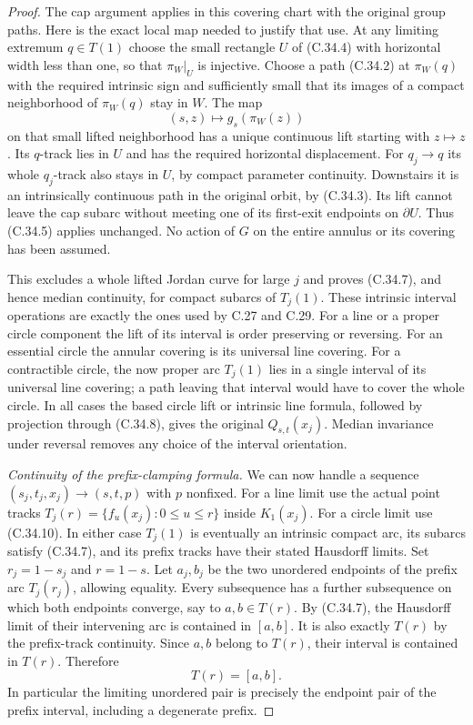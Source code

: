 \begin{proof}
The cap argument applies in this covering chart
with the original group paths. Here is the exact
local map needed to justify that use. At any
limiting extremum $q\in T(1)$ choose the small
rectangle $U$ of (C.34.4) with horizontal width
less than one, so that $\pi_W|_U$ is injective.
Choose a path (C.34.2) at $\pi_W(q)$ with the
required intrinsic sign and sufficiently small
that its images of a compact neighborhood of
$\pi_W(q)$ stay in $W$.
The map
\[
 (s,z)\longmapsto g_s(\pi_W(z))
                                                        \tag{C.34.11}
\]
on that small lifted neighborhood has a unique
continuous lift starting with $z\mapsto z$.
Its $q$-track lies in $U$ and has the required
horizontal displacement. For $q_j\to q$ its
whole $q_j$-track also stays in $U$, by compact
parameter continuity. Downstairs it is an
intrinsically continuous path in the original
orbit, by (C.34.3). Its lift cannot leave the
cap subarc without meeting one of its first-exit
endpoints on $\partial U$. Thus (C.34.5) applies
unchanged. No action of $G$ on the entire
annulus or its covering has been assumed.

This excludes a whole lifted Jordan curve for
large $j$ and proves (C.34.7), and hence median
continuity, for compact subarcs of $T_j(1)$.
These intrinsic interval operations are exactly
the ones used by C.27 and C.29. For a line or
a proper circle component the lift of its
interval is order preserving or reversing.
For an essential circle the annular covering
is its universal line covering. For a
contractible circle, the now proper arc
$T_j(1)$ lies in a single interval of its
universal line covering; a path leaving that
interval would have to cover the whole circle.
In all cases the based circle lift or intrinsic
line formula, followed by projection through
(C.34.8), gives the original $Q_{s,t}(x_j)$.
Median invariance under reversal removes any
choice of the interval orientation.

\emph{Continuity of the prefix-clamping formula.}
We can now handle a sequence
$(s_j,t_j,x_j)\to(s,t,p)$ with $p$ nonfixed.
For a line limit use the actual point tracks
$T_j(r)=\{f_u(x_j):0\leq u\leq r\}$ inside
$K_1(x_j)$. For a circle limit use (C.34.10).
In either case $T_j(1)$ is eventually an
intrinsic compact arc, its subarcs satisfy
(C.34.7), and its prefix tracks have their
stated Hausdorff limits.
Set $r_j=1-s_j$ and $r=1-s$.
Let $a_j,b_j$ be the two unordered endpoints
of the prefix arc $T_j(r_j)$, allowing equality.
Every subsequence has a further subsequence
on which both endpoints converge, say to
$a,b\in T(r)$. By (C.34.7), the Hausdorff
limit of their intervening arc is contained
in $[a,b]$. It is also exactly $T(r)$ by
the prefix-track continuity. Since $a,b$
belong to $T(r)$, their interval is contained
in $T(r)$. Therefore
\[
                         T(r)=[a,b].                    \tag{C.34.12}
\]
In particular the limiting unordered pair is
precisely the endpoint pair of the prefix
interval, including a degenerate prefix.


\end{proof}

